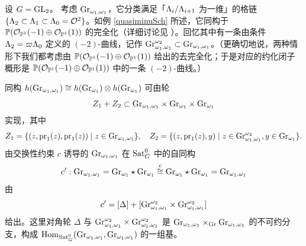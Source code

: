\begin{ex}
\label{R: comm via cycle}
设 $G={\operatorname{GL}}_2$。
考虑 ${\operatorname{Gr}}_{\omega_1,\omega_1}$，它分类满足「${\Lambda}_i/{\Lambda}_{i+1}$ 为一维」的格链 $\{{\Lambda}_2\subset{\Lambda}_1\subset{\Lambda}_0={\mathcal O}^2\}$。如例 \ref{quasiminuSch} 所述，它同构于 ${\mathbb P}({\mathcal O}_{{\mathbb P}^1}(-1)\oplus{\mathcal O}_{{\mathbb P}^1}(1))$ 的完全化（详细讨论见 \cite[\S B.3]{Zh1}）。回忆其中有一条由条件 ${\Lambda}_2=\varpi{\Lambda}_0$ 定义的 $(-2)$-曲线，记作 ${\operatorname{Gr}}_{\omega_1,\omega_1}^{\omega_2}\subset {\operatorname{Gr}}_{\omega_1,\omega_1}$。（更确切地说，两种情形下我们都考虑由 ${\mathbb P}({\mathcal O}_{{\mathbb P}^1}(-1)\oplus{\mathcal O}_{{\mathbb P}^1}(1))$ 给出的去完全化；于是对应的约化闭子概形是 ${\mathbb P}({\mathcal O}_{{\mathbb P}^1}(-1)\oplus{\mathcal O}_{{\mathbb P}^1}(1))$ 中的一条 $(-2)$-曲线。）

同构 $h({\operatorname{Gr}}_{\omega_1,\omega_1})\cong h({\operatorname{Gr}}_{\omega_1})\otimes h({\operatorname{Gr}}_{\omega_1})$ 可由轮
$$Z_1+Z_2\subset {\operatorname{Gr}}_{\omega_1,\omega_1}\times {\operatorname{Gr}}_{\omega_1}\times {\operatorname{Gr}}_{\omega_1}$$
实现，其中
$$Z_1=\{(z,{\operatorname{pr}}_1(z),{\operatorname{pr}}_1(z))\mid z\in {\operatorname{Gr}}_{\omega_1,\omega_1}\}, \quad Z_2=\{ (z, {\operatorname{pr}}_1(z), y)\mid z\in {\operatorname{Gr}}_{\omega_1,\omega_1}^{\omega_2}, y\in {\operatorname{Gr}}_{\omega_1}\}.$$
由交换性约束 $c$ 诱导的 ${\operatorname{Gr}}_{\omega_1,\omega_1}$ 在 $\operatorname{Sat}_G^0$ 中的自同构
\[c':{\operatorname{Gr}}_{\omega_1,\omega_1}= {\operatorname{Gr}}_{\omega_1}\star {\operatorname{Gr}}_{\omega_1}\stackrel{c}{\cong} {\operatorname{Gr}}_{\omega_1}\star {\operatorname{Gr}}_{\omega_1}={\operatorname{Gr}}_{\omega_1,\omega_1}\]
由
\begin{equation}
\label{E:comm via cycle}
c'=[\Delta]+[{\operatorname{Gr}}_{\omega_1,\omega_1}^{\omega_2}\times {\operatorname{Gr}}_{\omega_1,\omega_1}^{\omega_2}]
\end{equation}
给出。这里对角轮 $\Delta$ 与 ${\operatorname{Gr}}_{\omega_1,\omega_1}^{\omega_2}\times {\operatorname{Gr}}_{\omega_1,\omega_1}^{\omega_2}$ 是 ${\operatorname{Gr}}_{\omega_1,\omega_1}\times_{{\operatorname{Gr}}}{\operatorname{Gr}}_{\omega_1,\omega_1}$ 的不可约分支，构成
${\operatorname{Hom}}_{\operatorname{Sat}_G^{0}}({\operatorname{Gr}}_{\omega_1,\omega_1},{\operatorname{Gr}}_{\omega_1,\omega_1})$ 的一组基。
\end{ex}


